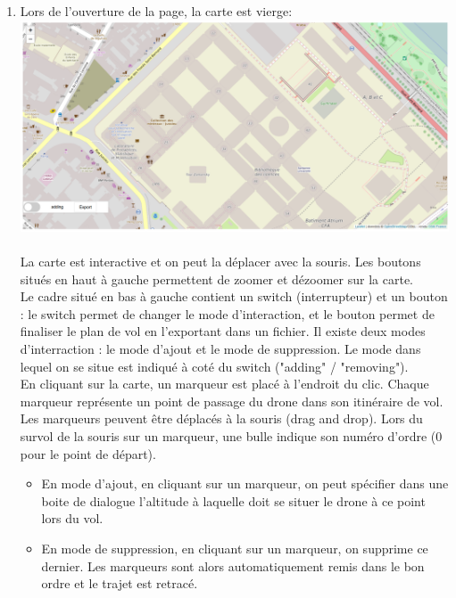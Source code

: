 \documentclass{article}
\begin{document}
 \begin{enumerate}
 \item Lors de l'ouverture de la page, la carte est vierge:\\
 \includegraphics[scale=0.42]{capt1.PNG}\\
 \\La carte est interactive et on peut la déplacer avec la souris.
  Les boutons situés en haut à gauche permettent de zoomer et dézoomer sur la carte.\\
 Le cadre situé en bas à gauche contient un switch (interrupteur) et un bouton : le switch permet de changer le mode d'interaction, et le bouton permet de finaliser le plan de vol en l'exportant dans un fichier.
 Il existe deux modes d'interraction :  le mode d'ajout et le mode de suppression. Le mode dans lequel on se situe est indiqué à coté du switch ("adding" / "removing").\\
  En cliquant sur la carte, un marqueur est placé à l'endroit du clic. Chaque marqueur représente un point de passage du drone dans son itinéraire de vol. Les marqueurs peuvent être déplacés à la souris (drag and drop). Lors du survol de la souris sur un marqueur, une bulle indique son numéro d'ordre (0 pour le point de départ).
  \begin{itemize}
 \item En mode d'ajout, en cliquant sur un marqueur, on peut spécifier dans une boite de dialogue l'altitude à laquelle doit se situer le drone à ce point lors du vol.
 \item En mode de suppression, en cliquant sur un marqueur, on supprime ce dernier. Les marqueurs sont alors automatiquement remis dans le bon ordre et le trajet est retracé.
 \end{itemize}
    \medbreak
   

\end{enumerate}
\end{document}
